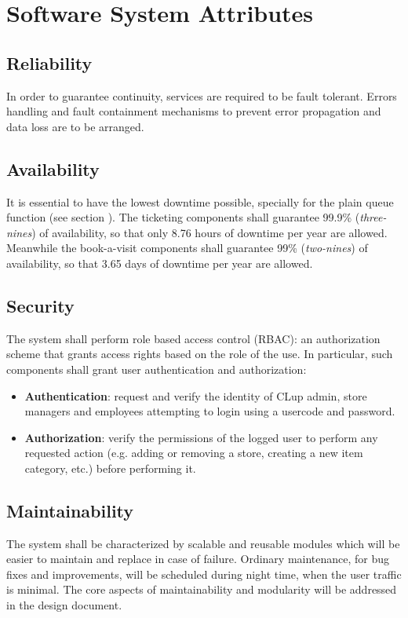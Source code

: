 \section{Software System Attributes}

\subsection{Reliability}
In order to guarantee continuity, services are required to be fault tolerant. Errors handling and fault containment mechanisms to prevent error propagation and data loss are to be arranged.

\subsection{Availability}
It is essential to have the lowest downtime possible, specially for the plain queue function (see section ).
The ticketing components shall guarantee 99.9\% (\textit{three-nines}) of availability, so that only 8.76 hours of downtime per year are allowed.
Meanwhile the book-a-visit components shall guarantee 99\% (\textit{two-nines}) of availability, so that 3.65 days of downtime per year are allowed.

\subsection{Security}
The system shall perform role based access control (RBAC): an authorization scheme that grants access rights based on the role of the use. In particular, such components shall grant user authentication and authorization:
\begin{itemize}
    \item \textbf{Authentication}: request and verify the identity of CLup admin, store managers and employees attempting to login using a usercode and password.
    \item \textbf{Authorization}: verify the permissions of the logged user to perform any requested action (e.g. adding or removing a store, creating a new item category, etc.) before performing it.
\end{itemize}

\subsection{Maintainability}
The system shall be characterized by scalable and reusable modules which will be easier to maintain and replace in case of failure. Ordinary maintenance, for bug fixes and improvements, will be scheduled during night time, when the user traffic is minimal.\newline
The core aspects of maintainability and modularity will be addressed in the design document.

